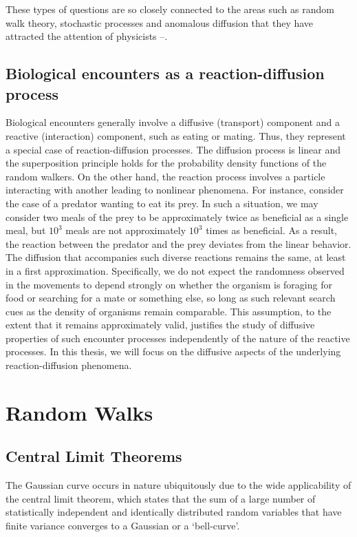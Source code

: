 \documentclass[12pt]{report}
\begin{document}
\begin{justify}
These types of questions are so closely connected to the areas such as random walk theory, stochastic processes and anomalous diffusion that they have attracted the attention of physicists \cite{optimalsearch}\nocite{levylikedetermine, masterEquation}--\cite{kineticsStochastics}.

\section{Biological encounters as a reaction-diffusion process}

Biological encounters generally involve a diffusive (transport) component and a reactive (interaction) component, such as eating or mating. Thus, they represent a special case of reaction-diffusion processes. The diffusion process is linear and the superposition principle holds for the probability density functions of the random walkers. On the other hand, the reaction process involves a particle interacting with another leading to nonlinear phenomena. For instance, consider the case of a predator wanting to eat its prey. In such a situation, we may consider two meals of the prey to be approximately twice as beneficial as a single meal, but $10^3$ meals are not approximately $10^3$ times as beneficial. As a result, the reaction between the predator and the prey deviates from the linear behavior.\\

The diffusion that accompanies such diverse reactions remains the same, at least in a first approximation. Specifically, we do not expect the randomness observed in the movements to depend strongly on whether the organism is foraging for food or searching for a mate or something else, so long as such relevant search cues as the density of organisms remain comparable. This assumption, to the extent that it remains approximately valid, justifies the study of diffusive properties of such encounter processes independently of the nature of the reactive processes. In this thesis, we will focus on the diffusive aspects of the underlying reaction-diffusion phenomena. 

\chapter{Random Walks}
\section{Central Limit Theorems}
The Gaussian curve occurs in nature ubiquitously due to the wide applicability of the central limit theorem, which states that the sum of a large number of statistically independent and identically distributed random variables that have finite variance converges to a Gaussian or a `bell-curve'.\\


\end{justify}
\end{document}
